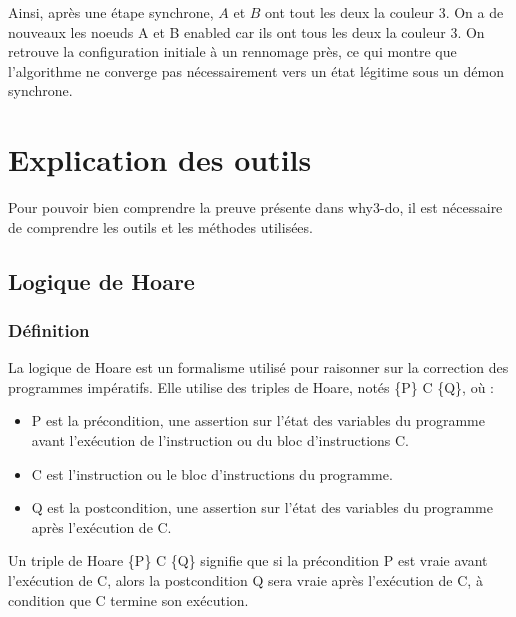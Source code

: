 \documentclass[11pt]{article}
\begin{document}
Ainsi, après une étape synchrone, \(A\) et \(B\) ont tout les deux la couleur 3.
On a de nouveaux les noeuds A et B enabled car ils ont tous les deux la couleur 3.
On retrouve la configuration initiale à un rennomage près, ce qui montre que l'algorithme ne converge pas nécessairement vers un état légitime sous un démon synchrone.




\section{Explication des outils}
\label{sec:org6518f37}
Pour pouvoir bien comprendre la preuve présente dans why3-do, il est nécessaire de comprendre les outils et les méthodes utilisées.

\subsection{Logique de Hoare}
\label{sec:org0ec9562}

\subsubsection{Définition}
\label{sec:org0ff232a}
La logique de Hoare est un formalisme utilisé pour raisonner sur la correction des programmes impératifs. Elle utilise des triples de Hoare, notés \{P\} C \{Q\}, où :

\begin{itemize}
\item P est la précondition, une assertion sur l'état des variables du programme avant l'exécution de l'instruction ou du bloc d'instructions C.
\item C est l'instruction ou le bloc d'instructions du programme.
\item Q est la postcondition, une assertion sur l'état des variables du programme après l'exécution de C.
\end{itemize}

Un triple de Hoare \{P\} C \{Q\} signifie que si la précondition P est vraie avant l'exécution de C, alors la postcondition Q sera vraie après l'exécution de C, à condition que C termine son exécution.
\end{document}
